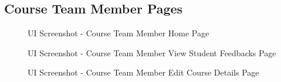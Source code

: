 \subsection{Course Team Member Pages}
\begin{figure}[H]
    \centering
    \caption{UI Screenshot - Course Team Member Home Page}
    \label{fig:ss_c_home}
\end{figure}

\begin{figure}[H]
    \centering
    \caption{UI Screenshot - Course Team Member View Student Feedbacks Page}
    \label{fig:ss_c_feedbacks}
\end{figure}

\begin{figure}[H]
    \centering
    \caption{UI Screenshot - Course Team Member Edit Course Details Page}
    \label{fig:ss_c_edit_course}
\end{figure}

